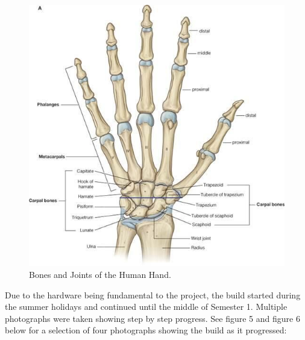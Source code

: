 \documentclass[progress]{cmpreport}
\begin{document}
\begin{figure}[H] 
	\centering
	\caption{Bones and Joints of the Human Hand.} 
	\includegraphics[height=0.4\textheight, keepaspectratio]{photos/hand.jpg} 
\end{figure}

Due to the hardware being fundamental to the project, the build started during the summer holidays and continued until the middle of Semester 1. Multiple photographs were taken showing step by step progress. See figure 5 and figure 6 below for a selection of four photographs showing the build as it progressed: 
\end{document}
